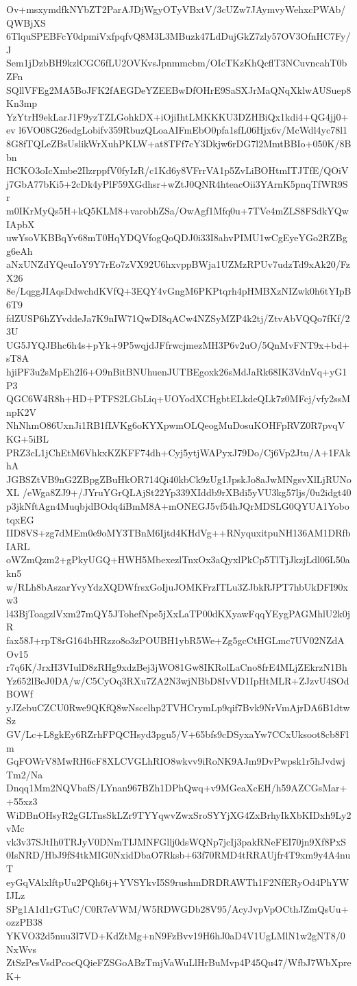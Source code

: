 Ov+msxymdfkNYbZT2ParAJDjWgyOTyVBxtV/3cUZw7JAymvyWehxcPWAb/QWBjXS
6TlquSPEBFcY0dpmiVxfpqfvQ8M3L3MBuzk47LdDujGkZ7zly57OV3OfnHC7Fy/J
Sem1jDzbBH9kzlCGC6fLU2OVKvsJpnmmcbm/OIcTKzKhQcflT3NCuvncahT0bZFn
SQllVFEg2MA5BoJFK2fAEGDeYZEEBwDfOHrE9SaSXJrMaQNqXklwAUSuep8Kn3mp
YzYtrH9ekLarJ1F9yzTZLGohkDX+iOjiIhtLMKKKU3DZHBiQx1kdi4+QG4jj0+ev
l6VO08G26edgLobifv359RbuzQLoaAIFmEbO0pfa1sfL06Hjx6v/McWdl4yc78l1
8G8fTQLeZBsUslikWrXuhPKLW+at8TFf7cY3Dkjw6rDG7l2MmtBBIo+050K/8Bbn
HCKO3oIcXmbe2IlzrppfV0fyIzR/c1Kd6y8VFrrVA1p5ZvLiBOHtmITJTfE/QOiV
j7GbA77bKi5+2cDk4yPlF59XGdhsr+wZtJ0QNR4hteacOii3YArnK5pnqTfWR9Sr
m0IKrMyQs5H+kQ5KLM8+varobhZSa/OwAgf1Mfq0u+7TVe4mZLS8FSdkYQwIApbX
uwYsoVKBBqYv68mT0HqYDQVfogQoQDJ0i33I8ahvPIMU1wCgEyeYGo2RZBgg6eAh
aNxUNZdYQeuIoY9Y7rEo7zVX92U6hxvppBWja1UZMzRPUv7udzTd9xAk20/FzX26
8e/LqggJIAqsDdwchdKVfQ+3EQY4vGngM6PKPtqrh4pHMBXzNIZwk0h6tYIpB6T9
fdZUSP6hZYvddeJa7K9nIW71QwDI8qACw4NZSyMZP4k2tj/ZtvAbVQQo7fKf/23U
UG5JYQJBhc6h4s+pYk+9P5wqjdJFfrwcjmezMH3P6v2uO/5QnMvFNT9x+bd+sT8A
hjiPF3u2sMpEh2I6+O9nBitBNUhuenJUTBEgoxk26sMdJaRk68IK3VdnVq+yG1P3
QGC6W4R8h+HD+PTFS2LGbLiq+UOYodXCHgbtELkdeQLk7z0MFcj/vfy2ssMnpK2V
NhNhmO86UxnJi1RB1fLVKg6oKYXpwmOLQeogMuDosuKOHFpRVZ0R7pvqVKG+5iBL
PRZ3cL1jChEtM6VhkxKZKFF74dh+Cyj5ytjWAPyxJ79Do/Cj6Vp2Jtu/A+1FAkhA
JGBSZtVB9nG2ZBpgZBuHkOR714Qi40kbCk9zUg1JpskJo8aJwMNgsvXlLjRUNoXL
/eWga8ZJ9+/JYruYGrQLAjSt22Yp339XIddb9rXBdi5yVU3kg57ljs/0u2idgt40
p3jkNftAgn4MuqbjdBOdq4iBmM8A+mONEGJ5vf54hJQrMDSLG0QYUA1YobotqxEG
IID8VS+zg7dMEm0e9oMY3TBnM6Ijtd4KHdVg++RNyquxitpuNH136AM1DRfbIARL
oWZmQzm2+gPkyUGQ+HWH5MbexezlTnxOx3aQyxlPkCp5TlTjJkzjLdl06L50akn5
w/RLh8bAszarYvyYdzXQDWfrsxGoIjuJOMKFrzITLu3ZJbkRJPT7hbUkDFI90xw3
l43BjToagzlVxm27mQY5JTohefNpe5jXxLaTP00dKXyawFqqYEygPAGMhlU2k0jR
fax58J+rpT8rG164bHRzzo8o3zPOUBH1ybR5We+Zg5gcCtHGLmc7UV02NZdAOv15
r7q6K/JrxH3VIulD8zRHg9xdzBej3jWO81Gw8IKRolLaCno8frE4MLjZEkrzN1Bh
Yz652lBeJ0DA/w/C5CyOq3RXu7ZA2N3wjNBbD8IvVD1IpHtMLR+ZJzvU4SOdBOWf
yJZebuCZCU0Rwe9QKfQ8wNscelhp2TVHCrymLp9qif7Bvk9NrVmAjrDA6B1dtwSz
GV/Lc+L8gkEy6RZrhFPQCHsyd3pgu5/V+65bfs9cDSyxaYw7CCxUksoot8cb8Flm
GqFOWrV8MwRH6cF8XLCVGLhRIO8wkvv9iRoNK9AJm9DvPwpsk1r5hJvdwjTm2/Na
Dnqq1Mm2NQVbafS/LYnan967BZh1DPhQwq+v9MGeaXcEH/h59AZCGsMar++55xz3
WiDBnOHsyR2gGLTnsSkLZr9TYYqwvZwxSroSYYjXG4ZxBrhyIkXbKIDxh9Ly2vMc
vk3v37SJtIh0TRJyV0DNmTIJMNFGllj0dsWQNp7jcIj3pakRNeFEI70jn9Xf8PxS
0IsNRD/HbJ9fS4tkMIG0NxidDbaO7Rksb+63f70RMD4tRRAUjfr4T9xm9y4A4nuT
eyGqVAlxlftpUu2PQh6tj+YVSYkvI5S9rushmDRDRAWTh1F2NfERyOd4PhYWIJLz
SPg1A1d1rGTuC/C0R7eVWM/W5RDWGDb28V95/AcyJvpVpOCthJZmQsUu+ozzPB38
YKVO32d5nuu3I7VD+KdZtMg+nN9FzBvv19H6hJ0aD4V1UgLMlN1w2gNT8/0NxWvs
ZtSzPesVsdPcocQQieFZSGoABzTmjVaWuLlHrBuMvp4P45Qu47/WfbJ7WbXpreK+
